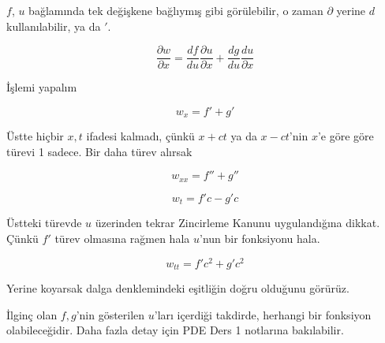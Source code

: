 \documentclass[12pt,fleqn]{article}\usepackage{../../common}
\begin{document}
$f$, $u$ bağlamında tek değişkene bağlıymış gibi görülebilir, o zaman
$\partial$ yerine $d$ kullanılabilir, ya da $'$. 

$$ \frac{\partial w}{\partial x}  = 
\frac{df}{du}
\frac{\partial u}{\partial x} + 
\frac{dg}{du}
\frac{du}{\partial x} 
$$

İşlemi yapalım

$$ w_x = f' + g' $$

Üstte hiçbir $x,t$ ifadesi kalmadı, çünkü $x+ct$ ya da $x-ct$'nin $x$'e
göre göre türevi 1 sadece. Bir daha türev alırsak

$$ w_{xx} = f'' + g'' $$

$$ w_t = f'c - g'c $$

Üstteki türevde $u$ üzerinden tekrar Zincirleme Kanunu uygulandığına
dikkat. Çünkü $f'$ türev olmasına rağmen hala $u$'nun bir fonksiyonu hala.

$$ w_{tt} = f'c^2 + g'c^2 $$

Yerine koyarsak dalga denklemindeki eşitliğin doğru olduğunu görürüz. 

İlginç olan $f,g$'nin gösterilen $u$'ları içerdiği takdirde, herhangi bir
fonksiyon olabileceğidir. Daha fazla detay için PDE Ders 1 notlarına
bakılabilir.
\end{document}
